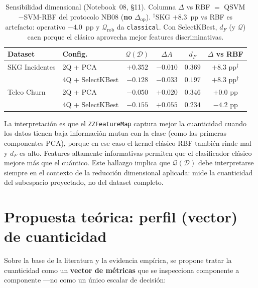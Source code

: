 \begin{table}[ht]
\centering
\small
\begin{tabular}{llcccc}
\hline
\textbf{Dataset} & \textbf{Config.} & $\mathcal{Q}(\mathcal{D})$ & $\Delta A$ & $d_F$ & \textbf{$\Delta$ vs RBF} \\
\hline
SKG Incidentes & 2Q + PCA       & $+0.352$ & $-0.010$ & $0.369$ & $+8.3$ pp$^\dagger$ \\
               & 4Q + SelectKBest & $-0.128$ & $-0.033$ & $0.197$ & $+8.3$ pp$^\dagger$ \\
Telco Churn    & 2Q + PCA       & $-0.050$ & $+0.020$ & $0.346$ & $+0.0$ pp \\
               & 4Q + SelectKBest & $-0.155$ & $+0.055$ & $0.234$ & $-4.2$ pp \\
\hline
\end{tabular}
\caption{Sensibilidad dimensional (Notebook~08, §11). Columna $\Delta$ vs RBF $=$ QSVM$-$SVM-RBF del protocolo NB08 (\textbf{no} $\Delta_{\mathrm{op}}$). $^\dagger$SKG $+8.3$~pp vs RBF es artefacto: operativo $-4.0$~pp y $\mathcal{Q}_{\mathrm{rob}}$ da \texttt{classical}. Con SelectKBest, $d_F$ (y $\mathcal{Q}$) caen porque el clásico aprovecha mejor features discriminativas.}
\label{tab:sensibilidad_dim}
\end{table}

La interpretación es que el \texttt{ZZFeatureMap} captura mejor la cuanticidad cuando los datos tienen baja información mutua con la clase (como las primeras componentes PCA), porque en ese caso el kernel clásico RBF también rinde mal y $d_F$ es alto. Features altamente informativas permiten que el clasificador clásico mejore más que el cuántico. Este hallazgo implica que $\mathcal{Q}(\mathcal{D})$ debe interpretarse siempre en el contexto de la reducción dimensional aplicada: mide la cuanticidad del subespacio proyectado, no del dataset completo.

\section{Propuesta teórica: perfil (vector) de cuanticidad}
\label{sec:score_cuanticidad}

Sobre la base de la literatura y la evidencia empírica, se propone tratar la cuanticidad como un \textbf{vector de métricas} que se inspecciona componente a componente ---no como un único escalar de decisión:


